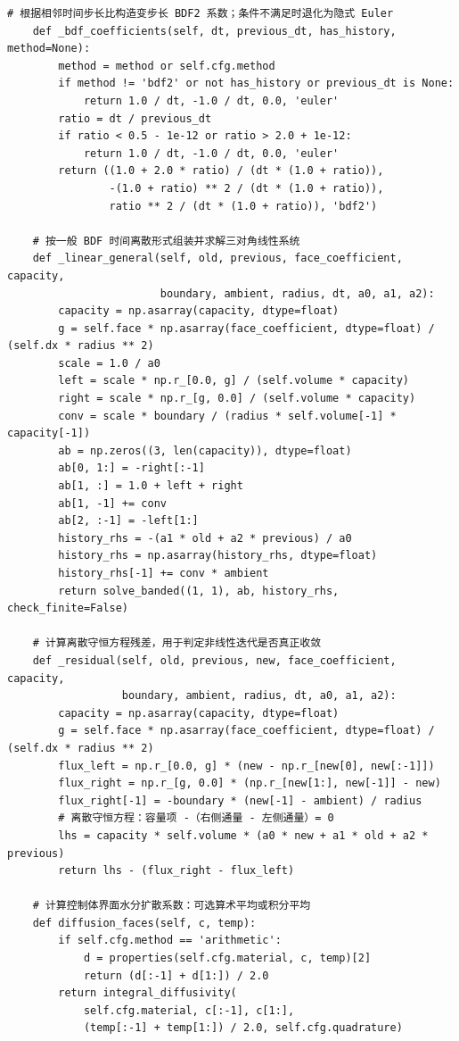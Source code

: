 \begin{Verbatim}[fontsize=\scriptsize,breaklines=true,breakanywhere=true]
    # 根据相邻时间步长比构造变步长 BDF2 系数；条件不满足时退化为隐式 Euler
    def _bdf_coefficients(self, dt, previous_dt, has_history, method=None):
        method = method or self.cfg.method
        if method != 'bdf2' or not has_history or previous_dt is None:
            return 1.0 / dt, -1.0 / dt, 0.0, 'euler'
        ratio = dt / previous_dt
        if ratio < 0.5 - 1e-12 or ratio > 2.0 + 1e-12:
            return 1.0 / dt, -1.0 / dt, 0.0, 'euler'
        return ((1.0 + 2.0 * ratio) / (dt * (1.0 + ratio)),
                -(1.0 + ratio) ** 2 / (dt * (1.0 + ratio)),
                ratio ** 2 / (dt * (1.0 + ratio)), 'bdf2')

    # 按一般 BDF 时间离散形式组装并求解三对角线性系统
    def _linear_general(self, old, previous, face_coefficient, capacity,
                        boundary, ambient, radius, dt, a0, a1, a2):
        capacity = np.asarray(capacity, dtype=float)
        g = self.face * np.asarray(face_coefficient, dtype=float) / (self.dx * radius ** 2)
        scale = 1.0 / a0
        left = scale * np.r_[0.0, g] / (self.volume * capacity)
        right = scale * np.r_[g, 0.0] / (self.volume * capacity)
        conv = scale * boundary / (radius * self.volume[-1] * capacity[-1])
        ab = np.zeros((3, len(capacity)), dtype=float)
        ab[0, 1:] = -right[:-1]
        ab[1, :] = 1.0 + left + right
        ab[1, -1] += conv
        ab[2, :-1] = -left[1:]
        history_rhs = -(a1 * old + a2 * previous) / a0
        history_rhs = np.asarray(history_rhs, dtype=float)
        history_rhs[-1] += conv * ambient
        return solve_banded((1, 1), ab, history_rhs, check_finite=False)

    # 计算离散守恒方程残差，用于判定非线性迭代是否真正收敛
    def _residual(self, old, previous, new, face_coefficient, capacity,
                  boundary, ambient, radius, dt, a0, a1, a2):
        capacity = np.asarray(capacity, dtype=float)
        g = self.face * np.asarray(face_coefficient, dtype=float) / (self.dx * radius ** 2)
        flux_left = np.r_[0.0, g] * (new - np.r_[new[0], new[:-1]])
        flux_right = np.r_[g, 0.0] * (np.r_[new[1:], new[-1]] - new)
        flux_right[-1] = -boundary * (new[-1] - ambient) / radius
        # 离散守恒方程：容量项 -（右侧通量 - 左侧通量）= 0
        lhs = capacity * self.volume * (a0 * new + a1 * old + a2 * previous)
        return lhs - (flux_right - flux_left)

    # 计算控制体界面水分扩散系数：可选算术平均或积分平均
    def diffusion_faces(self, c, temp):
        if self.cfg.method == 'arithmetic':
            d = properties(self.cfg.material, c, temp)[2]
            return (d[:-1] + d[1:]) / 2.0
        return integral_diffusivity(
            self.cfg.material, c[:-1], c[1:],
            (temp[:-1] + temp[1:]) / 2.0, self.cfg.quadrature)



\end{Verbatim}
